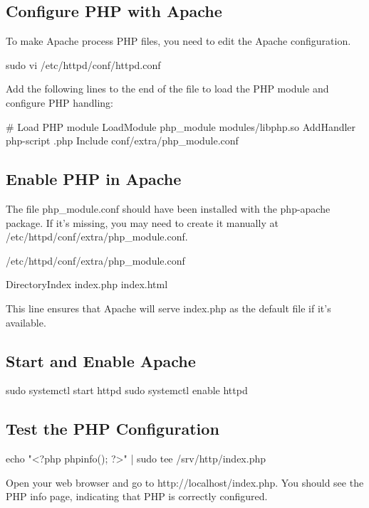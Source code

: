 \documentclass{report}
\begin{document}
    \bigbreak \noindent 
    \subsection{Configure PHP with Apache}
    \bigbreak \noindent 
    To make Apache process PHP files, you need to edit the Apache configuration.
    \bigbreak \noindent 
    \begin{bashcode}
    sudo vi /etc/httpd/conf/httpd.conf
    \end{bashcode}
    \bigbreak \noindent 
    Add the following lines to the end of the file to load the PHP module and configure PHP handling:
    \bigbreak \noindent 
    \begin{bashcode}
        # Load PHP module
        LoadModule php_module modules/libphp.so
        AddHandler php-script .php
        Include conf/extra/php_module.conf
    \end{bashcode}
    \bigbreak \noindent 
    \subsection{Enable PHP in Apache}
    \bigbreak \noindent 
    The file php\_module.conf should have been installed with the php-apache package. If it's missing, you may need to create it manually at /etc/httpd/conf/extra/php\_module.conf.
    \bigbreak \noindent 
    \begin{bashcode}
    /etc/httpd/conf/extra/php\_module.conf
    \end{bashcode}
    \bigbreak \noindent 
    \begin{bashcode}
    DirectoryIndex index.php index.html
    \end{bashcode}
    \bigbreak \noindent 
    This line ensures that Apache will serve index.php as the default file if it’s available.
    \bigbreak \noindent 
    \subsection{Start and Enable Apache}
    \bigbreak \noindent 
    \begin{bashcode}
        sudo systemctl start httpd
        sudo systemctl enable httpd
    \end{bashcode}
    \bigbreak \noindent 
    \subsection{Test the PHP Configuration}
    \bigbreak \noindent 
    \begin{bashcode}
        echo "<?php phpinfo(); ?>" | sudo tee /srv/http/index.php
    \end{bashcode}
    \bigbreak \noindent 
    Open your web browser and go to http://localhost/index.php. You should see the PHP info page, indicating that PHP is correctly configured.
    \bigbreak \noindent 
\end{document}
